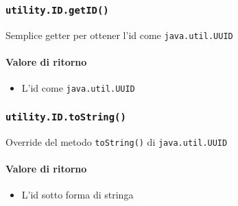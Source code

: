 \subsubsection{\texttt{utility.ID.getID()}}
Semplice getter per ottener l'id come \texttt{java.util.UUID}

\paragraph{Valore di ritorno}
\begin{itemize}
\item L'id come \texttt{java.util.UUID}
\end{itemize}

\subsubsection{\texttt{utility.ID.toString()}}
Override del metodo \texttt{toString()} di \texttt{java.util.UUID}
\paragraph{Valore di ritorno}
\begin{itemize}
\item L'id sotto forma di stringa
\end{itemize}

  
